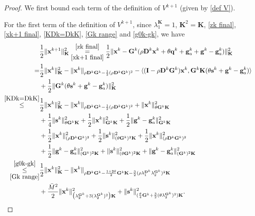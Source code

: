 \documentclass[12pt,draftcls,onecolumn]{IEEEtran}
\begin{document}
\begin{proof}
	We first bound each term of the definition of $V^{k+1}$ (given by \eqref{def V}).
	
	For the first term of the definition of $V^{k+1}$, since $\lambda_1^\mathbf{K} =1$, $\mathbf{K}^2=\mathbf{K}$, \eqref{zk final}, \eqref{xk+1 final}, \eqref{KDk=DkK}, \eqref{Gk range} and \eqref{g0k-gk}, we have
\begin{align}
	&\frac{1}{2}\|\mathbf{x}^{k+1}\|_{\mathbf{K}}^2 
	\underset{\eqref{xk+1 final}}{\overset{\eqref{zk final}}{=}}  \frac{1}{2}\|\mathbf{x}^k - \mathbf{G}^k(\rho \mathbf{D}^k \mathbf{x}^k + \theta\mathbf{q}^k +\mathbf{g}_a^k + \mathbf{g}^k-\mathbf{g}_a^k)\|_{\mathbf{K}}^2 \notag\\
	= & \frac{1}{2}\|\mathbf{x}^k\|_{\mathbf{K}}^2-\|\mathbf{x}^k\|_{\rho \mathbf{D}^k\mathbf{G}^k-\frac{1}{2}(\rho {\mathbf{D}^k}{\mathbf{G}^k})^2} - \langle (\mathbf{I}-\rho \mathbf{D}^k\mathbf{G}^k)\mathbf{x}^k,\mathbf{G}^k\mathbf{K}(\theta \mathbf{s}^k+\mathbf{g}^k-\mathbf{g}_a^k) \rangle \notag\\
	& +\frac{1}{2}\|\mathbf{G}^k(\theta\mathbf{s}^k+\mathbf{g}^k-\mathbf{g}_a^k)\|^2_{\mathbf{K}} \notag\\
	\overset{\eqref{KDk=DkK}}{\leq} & \frac{1}{2}\|\mathbf{x}^k\|_{\mathbf{K}}^2-\|\mathbf{x}^k\|_{\rho \mathbf{D}^k\mathbf{G}^k-\frac{1}{2}(\rho {\mathbf{D}^k}{\mathbf{G}^k})^2} +\|\mathbf{x}^k\|_{\theta\mathbf{G}^k\mathbf{K}}^2\notag\\
	&+\frac{1}{4}\|\mathbf{s}^k\|_{\theta\mathbf{G}^k\mathbf{K}}^2+\frac{1}{2}\|\mathbf{x}^k\|^2_{\mathbf{G}^k\mathbf{K}}+\frac{1}{2}\|\mathbf{g}^k-\mathbf{g}^k_a\|^2_{\mathbf{G}^k\mathbf{K}}\notag\\
	& +\frac{1}{2}\|\mathbf{x}^k\|^2_{(\rho{\mathbf{D}^k}{\mathbf{G}^k})^2}+\frac{1}{2}\|\mathbf{s}^k\|^2_{(\theta{\mathbf{G}^k})^2\mathbf{K}}+\frac{1}{2}\|\mathbf{x}^k\|^2_{(\rho{\mathbf{D}^k}{\mathbf{G}^k})^2}\notag\\
	&+\frac{1}{2}\|\mathbf{g}^k-\mathbf{g}^k_a\|^2_{({\mathbf{G}^k})^2\mathbf{K}} + \|\mathbf{s}^k\|^2_{(\theta{\mathbf{G}^k})^2\mathbf{K}}+\|\mathbf{g}^k-\mathbf{g}^k_a\|^2_{({\mathbf{G}^k})^2\mathbf{K}} \notag\\
	\underset{\eqref{Gk range}}{\overset{\eqref{g0k-gk}}{\leq}} & \frac{1}{2}\|\mathbf{x}^k\|_{\mathbf{K}}^2-\|\mathbf{x}^k\|_{\rho \mathbf{D}^k\mathbf{G}^k-\frac{1+2\theta}{2}\mathbf{G}^k\mathbf{K}-\frac{3}{2}(\rho\lambda_1^{\mathbf{D}^k}\lambda_2^{\mathbf{G}^k})^2\mathbf{K}}\notag\\
	& +\frac{\bar{M}^2}{2}\|\mathbf{x}^k\|^2_{\big(\lambda_2^{\mathbf{G}^k}+3(\lambda_2^{\mathbf{G}^k})^2\big)\mathbf{K}}+\|\mathbf{s}^k\|^2_{(\frac{\theta}{4}{\mathbf{G}^k}+\frac{3}{2}(\theta\lambda_2^{\mathbf{G}^k})^2)\mathbf{K}}.
	\label{norm xk+1}
\end{align}


\end{proof}
\end{document}
